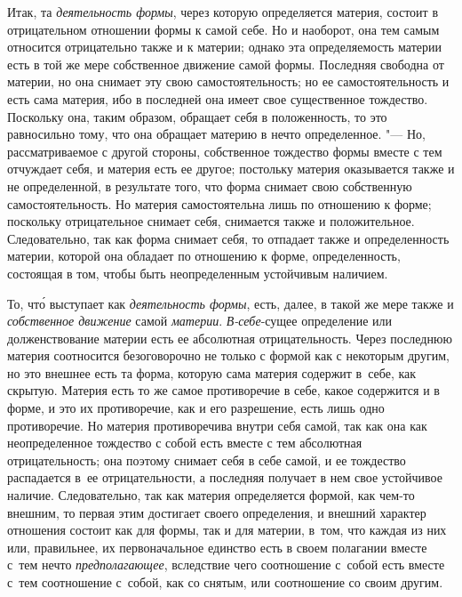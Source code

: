 Итак, та {\em деятельность формы}, через которую определяется материя, состоит
в отрицательном отношении формы к самой себе. Но и наоборот, она тем самым
относится отрицательно также и к материи; однако эта определяемость материи
есть в той же мере собственное движение самой формы. Последняя свободна от
материи, но она снимает эту свою самостоятельность; но ее самостоятельность и
есть сама материя, ибо в последней она имеет свое существенное тождество.
Поскольку она, таким образом, обращает себя в положенность, то это равносильно
тому, что она обращает материю в нечто определенное. "--- Но, рассматриваемое с
другой стороны, собственное тождество формы вместе с тем отчуждает себя, и
материя есть ее другое; постольку материя оказывается также и не определенной,
в результате того, что форма снимает свою собственную самостоятельность. Но
материя самостоятельна лишь по отношению к форме; поскольку отрицательное
снимает себя, снимается также и положительное. Следовательно, так как форма
снимает себя, то отпадает также и определенность материи, которой она обладает
по отношению к форме, определенность, состоящая в том, чтобы быть
неопределенным устойчивым наличием.

То, чт\'{о} выступает как {\em деятельность формы}, есть, далее, в такой же
мере также и {\em собственное движение} самой {\em материи}. {\em В-себе}-сущее
определение или долженствование материи есть ее абсолютная отрицательность.
Через последнюю материя соотносится безоговорочно не только с формой как с
некоторым другим, но это внешнее есть та форма, которую сама материя содержит
в~себе, как скрытую. Материя есть то же самое противоречие в себе, какое
содержится и в форме, и это их противоречие, как и его разрешение, есть лишь
одно противоречие. Но материя противоречива внутри себя самой, так как она как
неопределенное тождество с собой есть вместе с тем абсолютная отрицательность;
она поэтому снимает себя в себе самой, и ее тождество распадается в~ее
отрицательности, а последняя получает в нем свое устойчивое наличие.
Следовательно, так как материя определяется формой, как чем-то внешним, то
первая этим достигает своего определения, и внешний характер отношения состоит
как для формы, так и для материи, в~том, что каждая из них или, правильнее, их
первоначальное единство есть в своем полагании вместе с~тем нечто
{\em предполагающее}, вследствие чего соотношение с~собой есть вместе с~тем
соотношение с~собой, как со снятым, или соотношение со своим другим.

